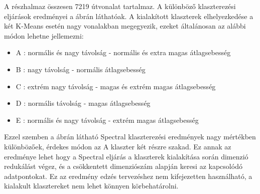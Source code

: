 
A részhalmaz összesen 7219 útvonalat tartalmaz. A különböző klaszterezési eljárások eredményei a  ábrán láthatóak. A kialakított klaszterek elhelyezkedése a két K-Means esetén nagy vonalakban megegyezik, ezeket általánosan az alábbi módon lehetne jellemezni:
\begin{itemize}
	\item A : normális és nagy távolság - normális és extra magas átlagsebesség
	\item B : nagy távolság - normális átlagsebesség
	\item C : extrém nagy távolság - magas és extrém magas átlagsebesség
	\item D : normális távolság - magas átlagsebesség
	\item E : normális és nagy távolság - extrém magas átlagsebesség
\end{itemize}
Ezzel szemben a  ábrán látható Spectral klaszterezési eredmények nagy mértékben különbözőek, érdekes módon az A klaszter két részre szakad. Ez annak az eredménye lehet hogy a Spectral eljárás a klaszterek kialakítása során dimenzió redukálást végez, és a csökkentett dimenziószám alapján keresi az kapcsolódó adatpontokat. Ez az eredmény edzés tervezéshez nem kifejezetten használható, a kialakult klasztereket nem lehet könnyen körbehatárolni.




